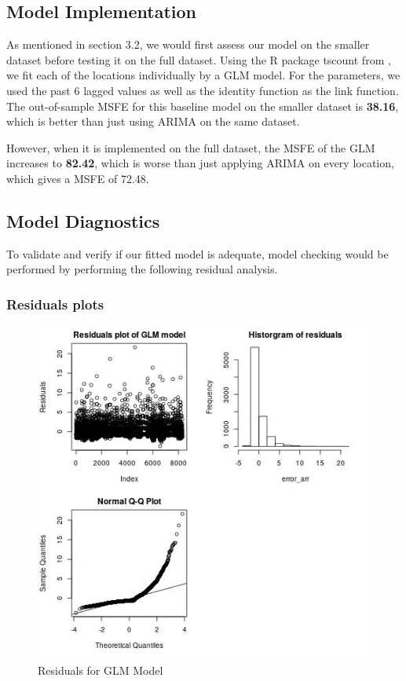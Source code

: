 \documentclass[12pt, letterpaper] {article}
\begin{document}

\subsection{Model Implementation}
\noindent As mentioned in section 3.2, we would first assess our model on the smaller dataset before testing it on the full dataset. Using the R package tscount from \cite{Tobias2017}, we fit each of the locations individually by a GLM model. For the parameters, we used the past 6 lagged values as well as the identity function as the link function. The out-of-sample MSFE for this baseline model on the smaller dataset is \textbf{38.16}, which is better than just using ARIMA on the same dataset.  

\noindent However, when it is implemented on the full dataset, the MSFE of the GLM increases to \textbf{82.42}, which is worse than just applying ARIMA on every location, which gives a MSFE of 72.48. 

\subsection{Model Diagnostics}
To validate and verify if our fitted model is adequate, model checking would be performed by performing the following residual analysis.		

\subsubsection{Residuals plots}

\begin{figure}[H]
    \centering
    \includegraphics[width=\textwidth, height=0.7\textheight]{Images/Full_GLM_resids.jpg}
    \caption{Residuals for GLM Model}
    \label{fig:Residuals for GLM Model}
\end{figure}
\end{document}

